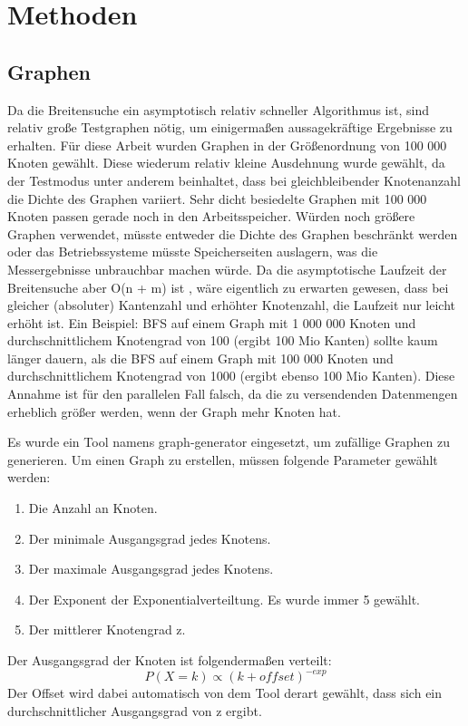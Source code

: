 
\chapter{Methoden} %
\label{cha:methoden}

\section{Graphen} %
\label{sec:graphen}
Da die Breitensuche ein asymptotisch relativ schneller Algorithmus ist, sind relativ große Testgraphen nötig, um einigermaßen aussagekräftige Ergebnisse zu erhalten. Für diese Arbeit wurden Graphen in der Größenordnung von 100 000 Knoten gewählt. Diese wiederum relativ kleine Ausdehnung wurde gewählt, da der Testmodus unter anderem beinhaltet, dass bei gleichbleibender Knotenanzahl die Dichte des Graphen variiert. Sehr dicht besiedelte Graphen mit 100 000 Knoten passen gerade noch in den Arbeitsspeicher. Würden noch größere Graphen verwendet, müsste entweder die Dichte des Graphen beschränkt werden oder das Betriebssysteme müsste Speicherseiten auslagern, was die Messergebnisse unbrauchbar machen würde. Da die asymptotische Laufzeit der Breitensuche aber O(n + m) ist \cite{SWB-283374373}, wäre eigentlich zu erwarten gewesen, dass bei gleicher (absoluter) Kantenzahl und erhöhter Knotenzahl, die Laufzeit nur leicht erhöht ist. Ein Beispiel: BFS auf einem Graph mit 1 000 000 Knoten und durchschnittlichem Knotengrad von 100 (ergibt 100 Mio Kanten) sollte kaum länger dauern, als die BFS auf einem Graph mit 100 000 Knoten und durchschnittlichem Knotengrad von 1000 (ergibt ebenso 100 Mio Kanten). Diese Annahme ist für den parallelen Fall falsch, da die zu versendenden Datenmengen erheblich größer werden, wenn der Graph mehr Knoten hat.

Es wurde ein Tool namens graph-generator \cite{graph-generator:2009:Online} eingesetzt, um zufällige Graphen zu generieren. Um einen Graph zu erstellen, müssen folgende Parameter gewählt werden:
\begin{enumerate}
	\item Die Anzahl an Knoten.
	\item Der minimale Ausgangsgrad jedes Knotens.
	\item Der maximale Ausgangsgrad jedes Knotens.
	\item Der Exponent der Exponentialverteiltung. Es wurde immer 5 gewählt.
	\item Der mittlerer Knotengrad z.
\end{enumerate}
Der Ausgangsgrad der Knoten ist folgendermaßen verteilt:
$$
P(X=k) \propto (k + offset)^{-exp}
$$
Der Offset wird dabei automatisch von dem Tool derart gewählt, dass sich ein durchschnittlicher Ausgangsgrad von z ergibt.

